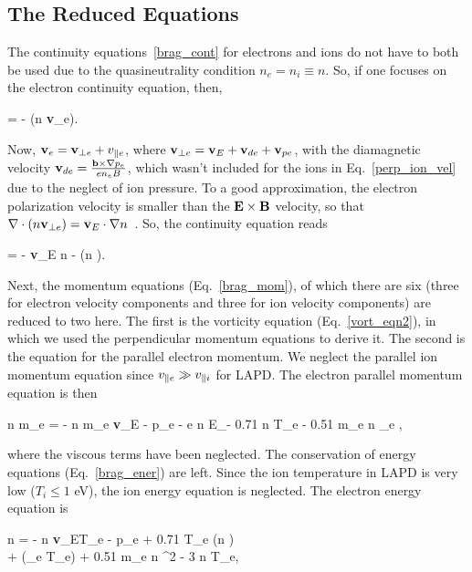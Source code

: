 \subsection{The Reduced Equations}
\label{ss_reduced_eqns}

The continuity equations~\ref{brag_cont} for electrons and ions do not have to both be used due to the quasineutrality condition $n_e = n_i \equiv n$. So, if one focuses on the electron
continuity equation, then,

\beq
\label{cont1}
 = - \grad \cdot (n {\bf v}_e).
\eeq

Now, ${\bf v}_e = {\bf v}_{\perp e} + v_{\parallel e}$, where ${\bf v}_{\perp e} = {\bf v}_{E} + {\bf v}_{d e} + {\bf v}_{p e}$, with the diamagnetic velocity 
${\bf v}_{d e} = \frac{{\bf b} \times \nabla p_e}{e n_e B}$, which wasn't included for the ions in Eq.~\ref{perp_ion_vel} due to the neglect of ion pressure. 
To a good approximation, the electron polarization velocity is smaller than the ${\bf E \times B}$ velocity, so that
$\nabla \cdot (n {\bf v}_{\perp e}) = {\bf v}_{E} \cdot \nabla n$~\cite{Popovich2010a,simakov2003}. So, the continuity equation reads

\beq
\label{cont_eqn}
 = - {\bf v}_{E} \cdot \grad n - \gradpar (n \vpe).
\eeq

Next, the momentum equations (Eq.~\ref{brag_mom}), of which there are six (three for electron velocity components and three for ion velocity components) are reduced to two here. The first is the
vorticity equation (Eq.~\ref{vort_eqn2}), in which we used the perpendicular momentum equations to derive it. The second is the equation for the parallel electron momentum. We neglect the parallel
ion momentum equation since $v_{\parallel e} \gg v_{\parallel i}$ for LAPD. The electron parallel momentum equation is then

\beq
\label{mom_eqn}
n m_e  = - n m_e {\bf v}_E \cdot \grad \vpe - \gradpar p_e - e n E_\para - 0.71 n \gradpar T_e - 0.51 m_e n \nu_e \vpe,
\eeq

where the viscous terms have been neglected. The conservation of energy equations (Eq.~\ref{brag_ener}) are left. Since the ion temperature in LAPD is very low ($T_i \leq 1$ eV), the ion energy
equation is neglected. The electron energy equation is~\cite{simakov2003}

\beqar
\label{elec_ener}
 n  = -  n {\bf v}_E\cdot \grad T_e - p_e \gradpar \vpe + 0.71 T_e \grad \cdot (n \vpe) \\ \nonumber
+ \gradpar (\kappa_{\para e} \gradpar T_e) + 0.51 m_e n \nue \vpe^2 - 3  n \nue T_e,
\eeqar

